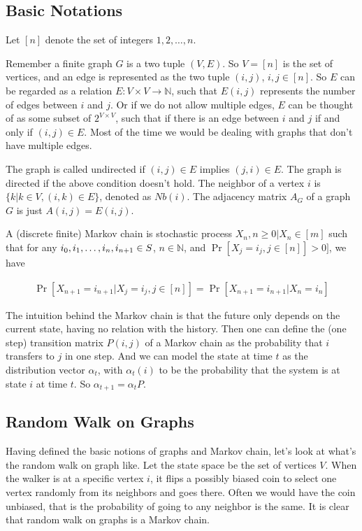 \subsection{Basic Notations}
Let $[n]$ denote the set of integers ${1, 2, \dots, n}$.

Remember a finite graph $G$ is a two tuple $(V, E)$. So
$V=[n]$ is the set of vertices, and an edge is represented as the two tuple $(i, j)$, $i, j\in[n]$.
So $E$ can be regarded as a relation $E: V\times V \rightarrow \mathbb{N}$, such that $E(i, j)$
represents the number of edges between $i$ and $j$. Or if we do not allow multiple edges, $E$
can be thought of as some subset of $2^{V\times V}$, such that if there is an edge between
$i$ and $j$ if and only if $(i, j)\in E$. Most of the time we would be dealing with
graphs that don't have multiple edges.

The graph is called undirected if $(i, j)\in E$ implies $(j, i)\in E$. The graph
is directed if the above condition doesn't hold. The neighbor of a vertex $i$ is $\{k|k\in V,
(i, k)\in E\}$, denoted as $Nb(i)$. The adjacency matrix $A_G$ of a graph $G$ is just
$A(i, j)=E(i, j)$.

A (discrete finite) Markov chain is stochastic process ${X_n, n\geq 0|X_n\in [m]}$ such that
for any $i_0, i_1, \dots, i_n, \\ i_{n+1}\in S$, $n\in \mathbb{N}$, and $\Pr [X_j=i_j, j\in [n]]>0]$,
we have

\begin{eqnarray*}
\Pr [X_{n+1}=i_{n+1}|X_j=i_j, j\in [n]]=\Pr [X_{n+1}=i_{n+1}|X_n=i_n]
\end{eqnarray*}

The intuition behind the Markov chain is that the future only depends on the current
state, having no relation with the history. Then one can define the (one step) transition
matrix $P(i, j)$ of a Markov chain as the probability that $i$ transfers to $j$ in one step.
And we can model the state at time $t$ as the distribution vector $\alpha_t$, with $\alpha_t(i)$
to be the probability that the system is at state $i$ at time $t$. So $\alpha_{t+1}=\alpha_t P$.

\subsection{Random Walk on Graphs}

Having defined the basic notions of graphs and Markov chain, let's look at what's the
random walk on graph like. Let the state space be the set of vertices $V$. When
the walker is at a specific vertex $i$, it flips a possibly biased coin to
select one vertex randomly from its neighbors and
goes there. Often we would have the coin unbiased, that is the probability of going
to any neighbor is the same. It is clear that random walk on graphs is a Markov chain.

